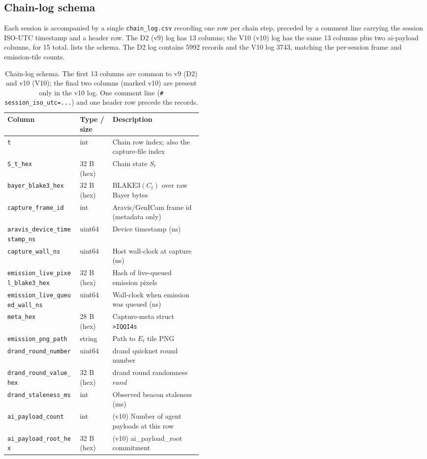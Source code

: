 \subsection{Chain-log schema}
\label{subsec:pc_schema}

Each session is accompanied by a single \texttt{chain\_log.csv} recording one row per chain step, preceded by a comment line carrying the session ISO-UTC timestamp and a header row. The D2 (v9) log has 13 columns; the V10 (v10) log has the same 13 columns plus two ai-payload columns, for 15 total.  lists the schema. The D2 log contains \num{5992} records and the V10 log \num{3743}, matching the per-session frame and emission-tile counts.

\begin{table}[t]
\centering
\caption{Chain-log schema. The first 13 columns are common to v9 (D2) and v10 (V10); the final two columns (marked v10) are present only in the v10 log. One comment line (\texttt{\# session\_iso\_utc=...}) and one header row precede the records.}
\label{tab:pc_chainlog}
\small
\begin{tabular}{@{}llp{0.46\linewidth}@{}}
\toprule
Column & Type / size & Description \\
\midrule
\texttt{t} & int & Chain row index; also the capture-file index \\
\texttt{S\_t\_hex} & 32 B (hex) & Chain state $S_t$ \\
\texttt{bayer\_blake3\_hex} & 32 B (hex) & $\mathrm{BLAKE3}(C_t)$ over raw Bayer bytes \\
\texttt{capture\_frame\_id} & int & Aravis/GenICam frame id (metadata only) \\
\texttt{aravis\_device\_timestamp\_ns} & uint64 & Device timestamp (ns) \\
\texttt{capture\_wall\_ns} & uint64 & Host wall-clock at capture (ns) \\
\texttt{emission\_live\_pixel\_blake3\_hex} & 32 B (hex) & Hash of live-queued emission pixels \\
\texttt{emission\_live\_queued\_wall\_ns} & uint64 & Wall-clock when emission was queued (ns) \\
\texttt{meta\_hex} & 28 B (hex) & Capture-meta struct \texttt{>IQQI4s} \\
\texttt{emission\_png\_path} & string & Path to $E_t$ tile PNG \\
\texttt{drand\_round\_number} & uint64 & drand quicknet round number \\
\texttt{drand\_round\_value\_hex} & 32 B (hex) & drand round randomness $\mathit{rand}$ \\
\texttt{drand\_staleness\_ms} & int & Observed beacon staleness (ms) \\
\midrule
\texttt{ai\_payload\_count} & int & (v10) Number of agent payloads at this row \\
\texttt{ai\_payload\_root\_hex} & 32 B (hex) & (v10) ai\_payload\_root commitment \\
\bottomrule
\end{tabular}
\end{table}

